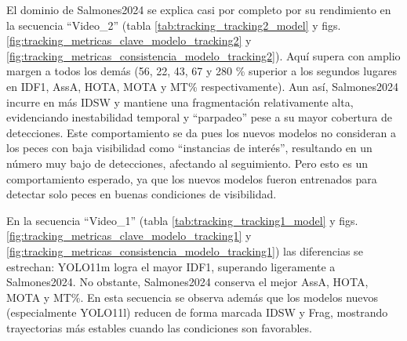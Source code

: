 El dominio de Salmones2024 se explica casi por completo por su rendimiento en la secuencia ``Video\_2'' (tabla \ref{tab:tracking_tracking2_model} y figs. \ref{fig:tracking_metricas_clave_modelo_tracking2} y \ref{fig:tracking_metricas_consistencia_modelo_tracking2}). Aquí supera con amplio margen a todos los demás (56, 22, 43, 67 y 280 \% superior a los segundos lugares en IDF1, AssA, HOTA, MOTA y MT\% respectivamente). Aun así, Salmones2024 incurre en más IDSW y mantiene una fragmentación relativamente alta, evidenciando inestabilidad temporal y ``parpadeo'' pese a su mayor cobertura de detecciones. Este comportamiento se da pues los nuevos modelos no consideran a los peces con baja visibilidad como ``instancias de interés'', resultando en un número muy bajo de detecciones, afectando al seguimiento. Pero esto es un comportamiento esperado, ya que los nuevos modelos fueron entrenados para detectar solo peces en buenas condiciones de visibilidad.

En la secuencia ``Video\_1'' (tabla \ref{tab:tracking_tracking1_model} y figs. \ref{fig:tracking_metricas_clave_modelo_tracking1} y \ref{fig:tracking_metricas_consistencia_modelo_tracking1}) las diferencias se estrechan: YOLO11m logra el mayor IDF1, superando ligeramente a Salmones2024. No obstante, Salmones2024 conserva el mejor AssA, HOTA, MOTA y MT\%. En esta secuencia se observa además que los modelos nuevos (especialmente YOLO11l) reducen de forma marcada IDSW y Frag, mostrando trayectorias más estables cuando las condiciones son favorables.

\begin{table}[htbp]
\centering
\caption[Resultados de seguimiento promedio entre ambos videos, por modelo]{Resultados de seguimiento promedio entre ambos videos, por modelo.}
\label{tab:tracking_promedio_model}
\end{table}

